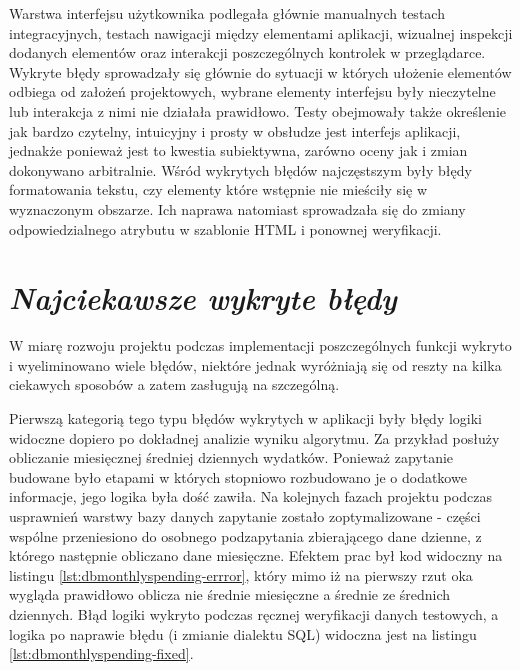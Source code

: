 \documentclass[a4paper,10pt, twoside]{report}
\newcommand{\customstylesection}[1]{\textbf{\textit{#1}}}
\begin{document}
\begin{large}
\medskip
{Warstwa interfejsu użytkownika podlegała głównie manualnych testach 
integracyjnych, testach nawigacji między elementami aplikacji, wizualnej 
inspekcji dodanych elementów oraz interakcji poszczególnych kontrolek w 
przeglądarce. Wykryte błędy sprowadzały się głównie do sytuacji w których 
ułożenie elementów odbiega od założeń projektowych, wybrane elementy 
interfejsu były nieczytelne lub interakcja z nimi nie działała prawidłowo. Testy
 obejmowały także określenie jak bardzo czytelny, intuicyjny i prosty w obsłudze
 jest interfejs aplikacji, jednakże ponieważ jest to kwestia subiektywna, 
zarówno oceny jak i zmian dokonywano arbitralnie. Wśród wykrytych błędów 
najczęstszym były błędy formatowania tekstu, czy elementy które wstępnie nie 
mieściły się w wyznaczonym obszarze. Ich naprawa natomiast sprowadzała się do 
zmiany odpowiedzialnego atrybutu w szablonie HTML i ponownej weryfikacji.}

\section{\customstylesection{Najciekawsze wykryte błędy}}
{W miarę rozwoju projektu podczas implementacji poszczególnych funkcji wykryto i
 wyeliminowano wiele błędów, niektóre jednak wyróżniają się od reszty na kilka 
ciekawych sposobów a zatem zasługują na szczególną.}

{Pierwszą kategorią tego typu błędów wykrytych w aplikacji były błędy logiki 
widoczne dopiero po dokładnej analizie wyniku algorytmu. Za przykład posłuży 
obliczanie miesięcznej średniej dziennych wydatków. Ponieważ zapytanie budowane 
było etapami w których stopniowo rozbudowano je o dodatkowe informacje, jego 
logika była dość zawiła. Na kolejnych fazach projektu podczas usprawnień warstwy
 bazy danych zapytanie zostało zoptymalizowane - części wspólne przeniesiono do 
osobnego podzapytania zbierającego dane dzienne, z którego następnie obliczano 
dane miesięczne. Efektem prac był kod widoczny na listingu 
\ref{lst:dbmonthlyspending-errror}, który mimo iż na pierwszy rzut oka wygląda 
prawidłowo oblicza nie średnie miesięczne a średnie ze średnich dziennych. Błąd 
logiki wykryto podczas ręcznej weryfikacji danych testowych, a logika po 
naprawie błędu (i zmianie dialektu SQL) widoczna jest na listingu 
\ref{lst:dbmonthlyspending-fixed}.}


\end{large}
\end{document}
